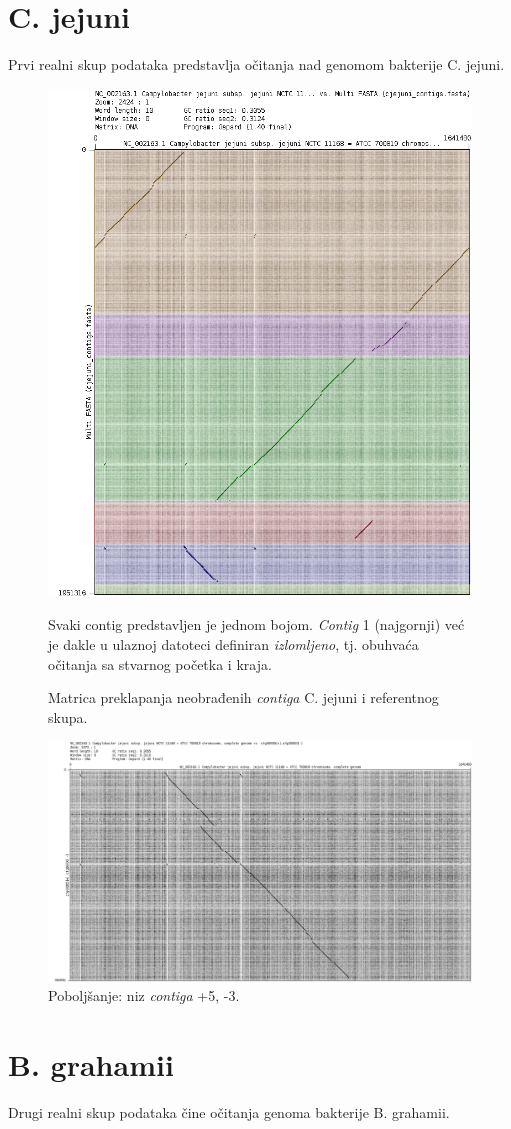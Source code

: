 \documentclass[times, utf8, seminar, numeric]{fer}
\begin{document}
\section{C. jejuni}
Prvi realni skup podataka predstavlja očitanja nad genomom bakterije C. jejuni.

\begin{figure}[h]
	\centering
	\centerline{\includegraphics[width=0.6\linewidth]{img/cj_contigs}}
	\caption{Matrica preklapanja neobrađenih \textit{contiga} C. jejuni i referentnog skupa.}
	\label{fig:cjcontigs}
	\small
	Svaki contig predstavljen je jednom bojom. \textit{Contig} 1 (najgornji) već je dakle u ulaznoj datoteci definiran \textit{izlomljeno}, tj. obuhvaća očitanja sa stvarnog početka i kraja.
\end{figure}

\begin{figure}[h]
	\centering
	\centerline{\includegraphics[width=0.6\linewidth]{img/cj_5_3}}
	\caption{Poboljšanje: niz \textit{contiga} +5, -3.}
	\label{fig:cj53}
\end{figure}

\section{B. grahamii}
Drugi realni skup podataka čine očitanja genoma bakterije B. grahamii.
\end{document}
